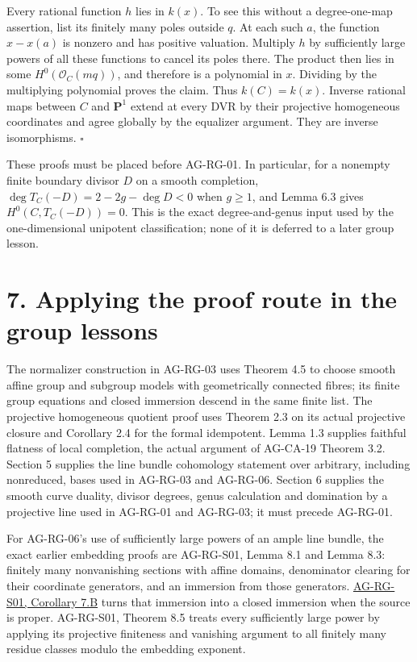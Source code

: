 \documentclass[11pt,a4paper,openany]{report}
\newcounter{none}
\begin{document}
Every rational function \(h\) lies in \(k(x)\). To see this without a degree-one-map assertion, list its finitely many poles outside \(q\). At each such \(a\), the function \(x-x(a)\) is nonzero and has positive valuation. Multiply \(h\) by sufficiently large powers of all these functions to cancel its poles there. The product then lies in some \(H^0(\mathcal O_C(mq))\), and therefore is a polynomial in \(x\). Dividing by the multiplying polynomial proves the claim. Thus \(k(C)=k(x)\). Inverse rational maps between \(C\) and \(\mathbf P^1\) extend at every DVR by their projective homogeneous coordinates and agree globally by the equalizer argument. They are inverse isomorphisms. \(\square\)

These proofs must be placed before AG-RG-01. In particular, for a nonempty finite boundary divisor \(D\) on a smooth completion, \(\deg T_C(-D)=2-2g-\deg D<0\) when \(g\geq1\), and Lemma 6.3 gives \(H^0(C,T_C(-D))=0\). This is the exact degree-and-genus input used by the one-dimensional unipotent classification; none of it is deferred to a later group lesson.

\section{7. Applying the proof route in the group lessons}\label{AG-RG-S02-applying-the-proof-route-in-the-group-lessons}

The normalizer construction in AG-RG-03 uses Theorem 4.5 to choose smooth affine group and subgroup models with geometrically connected fibres; its finite group equations and closed immersion descend in the same finite list. The projective homogeneous quotient proof uses Theorem 2.3 on its actual projective closure and Corollary 2.4 for the formal idempotent. Lemma 1.3 supplies faithful flatness of local completion, the actual argument of AG-CA-19 Theorem 3.2. Section 5 supplies the line bundle cohomology statement over arbitrary, including nonreduced, bases used in AG-RG-03 and AG-RG-06. Section 6 supplies the smooth curve duality, divisor degrees, genus calculation and domination by a projective line used in AG-RG-01 and AG-RG-03; it must precede AG-RG-01.

For AG-RG-06's use of sufficiently large powers of an ample line bundle, the exact earlier embedding proofs are AG-RG-S01, Lemma 8.1 and Lemma 8.3: finitely many nonvanishing sections with affine domains, denominator clearing for their coordinate generators, and an immersion from those generators. \href{AG-RG-S01.html\#projective-properness}{AG-RG-S01, Corollary 7.B} turns that immersion into a closed immersion when the source is proper. AG-RG-S01, Theorem 8.5 treats every sufficiently large power by applying its projective finiteness and vanishing argument to all finitely many residue classes modulo the embedding exponent.
\end{document}
